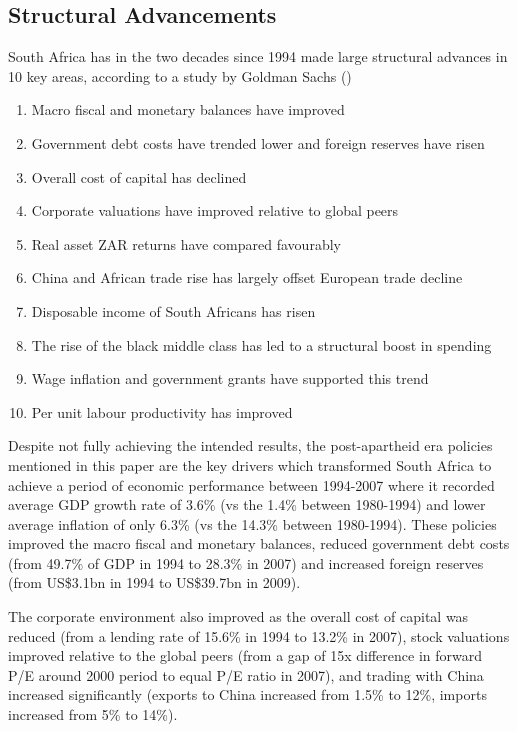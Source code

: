 \documentclass{elsarticle}
\begin{document}
\subsection{Structural Advancements}
South Africa has in the two decades since 1994 made large structural advances in 10 key areas, according to a study by Goldman Sachs (\cite{Coleman2013})

\begin{enumerate}
    \item Macro fiscal and monetary balances have improved
    \item Government debt costs have trended lower and foreign reserves have risen
    \item Overall cost of capital has declined
    \item Corporate valuations have improved relative to global peers
    \item Real asset ZAR returns have compared favourably
    \item China and African trade rise has largely offset European trade decline
    \item Disposable income of South Africans has risen
    \item The rise of the black middle class has led to a structural boost in spending
    \item Wage inflation and government grants have supported this trend
    \item Per unit labour productivity has improved
\end{enumerate}

Despite not fully achieving the intended results, the post-apartheid era policies mentioned in this paper are the key drivers which transformed South Africa to achieve a period of economic performance between 1994-2007 where it recorded average GDP growth rate of 3.6\% (vs the 1.4\% between 1980-1994) and lower average inflation of only 6.3\% (vs the 14.3\% between 1980-1994). These policies improved the macro fiscal and monetary balances, reduced government debt costs (from 49.7\% of GDP in 1994 to 28.3\% in 2007) and increased foreign reserves (from US\$3.1bn in 1994 to US\$39.7bn in 2009).

The corporate environment also improved as the overall cost of capital was reduced (from a lending rate of 15.6\% in 1994 to 13.2\% in 2007), stock valuations improved relative to the global peers (from a gap of 15x difference in forward P/E around 2000 period to equal P/E ratio in 2007), and trading with China increased significantly (exports to China increased from 1.5\% to 12\%, imports increased from 5\% to 14\%).
\end{document}
